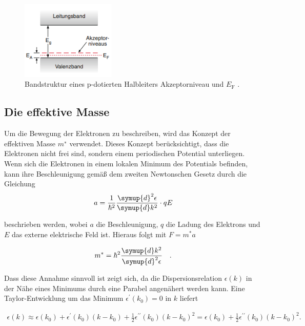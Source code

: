     \begin{figure}[H]
       \centering
       \includegraphics[width=0.4\textwidth]{Bilder/AkzeptorNiveau.png}
       \caption{Bandstruktur eines p-dotierten Halbleiters Akzeptorniveau und  $E_{\text{F}}$ \cite{Demtröder}.}
       \label{img:dot2}
   \end{figure}

    \subsection{Die effektive Masse}

    Um die Bewegung der Elektronen zu beschreiben, wird das Konzept der effektiven Masse $m^∗$ verwendet. Dieses Konzept berücksichtigt, dass die Elektronen nicht frei sind, sondern einem periodischen Potential unterliegen. Wenn sich die Elektronen in einem lokalen Minimum des Potentials befinden, kann ihre Beschleunigung gemäß dem zweiten Newtonschen Gesetz durch die Gleichung
    \begin{align*}
        a =\frac{1}{\hslash^2}\frac{\symup{d}^2\epsilon}{\symup{d}k^2} \cdot qE
    \end{align*}

    beschrieben werden, wobei $a$ die Beschleunigung, $q$ die Ladung des Elektrons und $E$ das externe elektrische Feld ist.
    Hieraus folgt mit $F=m^*a$

    \begin{equation}
    \label{eq:effektiveMasseeee}
        m^* =  \hbar^2 \frac{\symup{d}k^2}{\symup{d}^2\epsilon}\quad.
    \end{equation}

    Dass diese Annahme sinnvoll ist zeigt sich, da die Dispersionsrelation $\epsilon(k)$ in der Nähe eines Minimums durch eine Parabel angenähert werden kann.
    Eine Taylor-Entwicklung um das Minimum $\epsilon^{\prime}\left(k_0\right)=0$ in $k$ liefert

        \begin{align*}
            \epsilon(k) \approx \epsilon\left(k_0\right)+\epsilon^{\prime}\left(k_0\right)\left(k-k_0\right)+\frac{1}{2} \epsilon^{\prime \prime}\left(k_0\right)\left(k-k_0\right)^2=\epsilon\left(k_0\right)+\frac{1}{2} \epsilon^{\prime \prime}\left(k_0\right)\left(k-k_0\right)^2.
        \end{align*}

